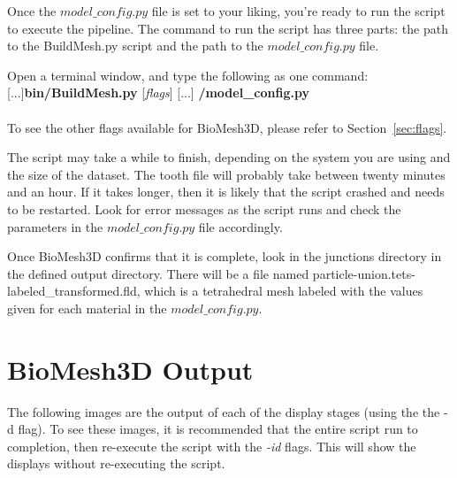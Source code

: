\documentclass[fleqn,12pt,openany]{book}
\begin{document}
Once the $model\_config.py$ file is set to your liking, you're ready to run the 
script to execute the pipeline.  The command to run the script has three parts: 
the path to the BuildMesh.py script and the path to the $model\_config.py$ file.  

Open a terminal window, and type the following as one command:\\

[...]{\bf bin/BuildMesh.py}  [{\it flags}] [...] {\bf /model\_config.py}\\ \\

To see the other flags available for BioMesh3D, please refer to Section~\ref{sec:flags}.

The script may take a while to finish, depending on the system you are using and 
the size of the dataset.  The tooth file will probably take between twenty 
minutes and an hour.  If it takes longer, then it is likely that the script 
crashed and needs to be restarted.  Look for error messages as the script runs and 
check the parameters in the $model\_config.py$ file accordingly.  

Once BioMesh3D confirms that it is complete, look in the junctions directory 
in the defined output directory.  There will be a file named particle-union.tets-labeled\_transformed.fld, which is a tetrahedral mesh labeled with the values given for each material in the $model\_config.py$.


\section{BioMesh3D Output}
\label{sec:output}

The following images are the output of each of the display stages (using the the -d flag).  To see these images, it is recommended that the entire script run to completion, then re-execute the script with the \emph{-id} flags.  This will show the displays without re-executing the script.
\end{document}
